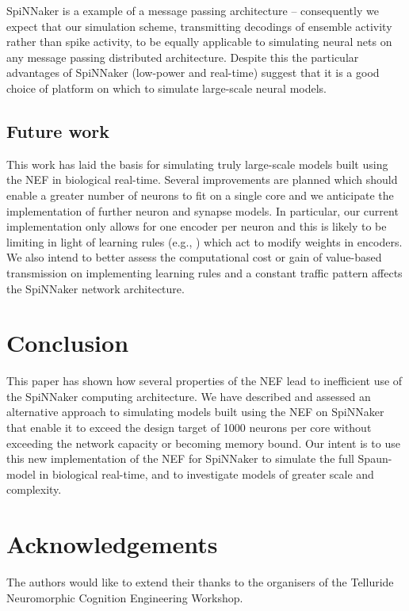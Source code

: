 \documentclass[conference]{IEEEtran}
\begin{document}
  SpiNNaker is a example of a message passing architecture -- consequently we expect that our simulation scheme, transmitting decodings of ensemble activity rather than spike activity, to be equally applicable to simulating neural nets on any message passing distributed architecture.
  Despite this the particular advantages of SpiNNaker (low-power and real-time) suggest that it is a good choice of platform on which to simulate large-scale neural models.

  \subsection{Future work}

  This work has laid the basis for simulating truly large-scale models built using the NEF in biological real-time.
  Several improvements are planned which should enable a greater number of neurons to fit on a single core and we anticipate the implementation of further neuron and synapse models.
  In particular, our current implementation only allows for one encoder per neuron and this is likely to be limiting in light of learning rules (e.g., \parencite{Voelker2014}) which act to modify weights in encoders.
  We also intend to better assess the computational cost or gain of value-based transmission on implementing learning rules and a constant traffic pattern affects the SpiNNaker network architecture.

  \section{Conclusion}

  This paper has shown how several properties of the NEF lead to inefficient use of the SpiNNaker computing architecture.
  We have described and assessed an alternative approach to simulating models built using the NEF on SpiNNaker that enable it to exceed the design target of 1000 neurons per core without exceeding the network capacity or becoming memory bound.
  Our intent is to use this new implementation of the NEF for SpiNNaker to simulate the full Spaun-model in biological real-time, and to investigate models of greater scale and complexity.

  \section*{Acknowledgements}

The authors would like to extend their thanks to the organisers of the Telluride Neuromorphic Cognition Engineering Workshop.

  \printbibliography
\end{document}
